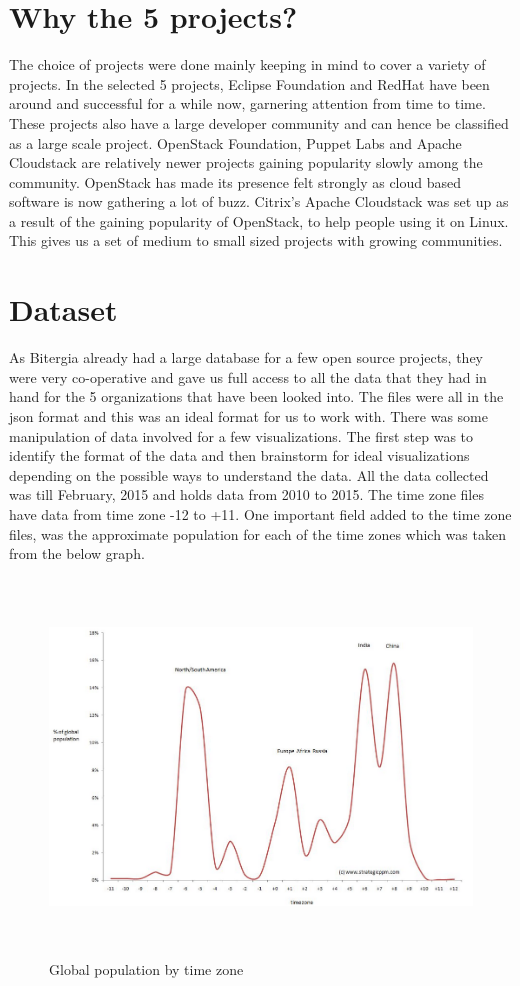 \documentclass[seploa]{beavtex}
\begin{document}
\section{Why the 5 projects?}
The choice of projects were done mainly keeping in mind to cover a variety of projects. In the selected 5 projects, Eclipse Foundation and RedHat have been around and successful for a while now, garnering attention from time to time. These projects also have a large developer community and can hence be classified as a large scale project. OpenStack Foundation, Puppet Labs and Apache Cloudstack are relatively newer projects gaining popularity slowly among the community. OpenStack has made its presence felt strongly as cloud based software is now gathering a lot of buzz. Citrix's Apache Cloudstack was set up as a result of the gaining popularity of OpenStack, to help people using it on Linux. This gives us a set of medium to small sized projects with growing communities.

\section{Dataset}
As Bitergia already had a large database for a few open source projects, they were very co-operative and gave us full access to all the data that they had in hand for the 5 organizations that have been looked into. The files were all in the json format and this was an ideal format for us to work with. There was some manipulation of data involved for a few visualizations. The first step was to identify the format of the data and then brainstorm for ideal visualizations depending on the possible ways to understand the data. All the data collected was till February, 2015 and holds data from 2010 to 2015. The time zone files have data from time zone -12 to +11. One important field added to the time zone files, was the approximate population for each of the time zones which was taken from the below graph.

\begin{figure}[!ht]
\centering
\includegraphics[width=160mm, height=100mm]{pop1.png}
\caption{Global population by time zone}
\end{figure}
\end{document}
